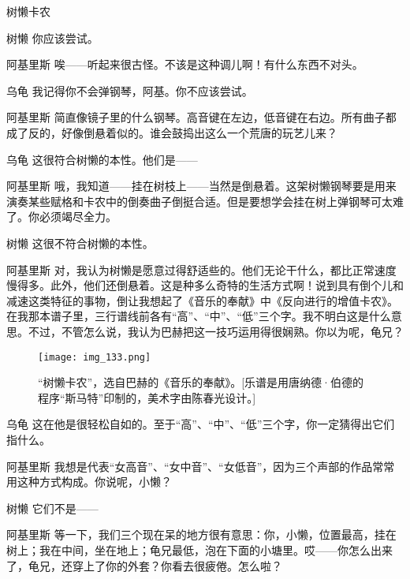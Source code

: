 \begin{dialog}{树懒卡农}
\begin{dialogue}
\item[树懒]你应该尝试。


\item[阿基里斯]唉——听起来很古怪。不该是这种调儿啊！有什么东西不对头。

\item[乌龟]我记得你不会弹钢琴，阿基。你不应该尝试。

\item[阿基里斯]简直像镜子里的什么钢琴。高音键在左边，低音键在右边。所有曲子都成了反的，好像倒悬着似的。谁会鼓捣出这么一个荒唐的玩艺儿来？

\item[乌龟]这很符合树懒的本性。他们是——

\item[阿基里斯]哦，我知道——挂在树枝上——当然是倒悬着。这架树懒钢琴要是用来演奏某些赋格和卡农中的倒奏曲子倒挺合适。但是要想学会挂在树上弹钢琴可太难了。你必须竭尽全力。

\item[树懒]这很不符合树懒的本性。

\item[阿基里斯]对，我认为树懒是愿意过得舒适些的。他们无论干什么，都比正常速度慢得多。此外，他们还倒悬着。这是种多么奇特的生活方式啊！说到具有倒个儿和减速这类特征的事物，倒让我想起了《音乐的奉献》中《反向进行的增值卡农》。在我那本谱子里，三行谱线前各有“高”、“中”、“低”三个字。我不明白这是什么意思。不过，不管怎么说，我认为巴赫把这一技巧运用得很娴熟。你以为呢，龟兄？

\begin{figure}
\texttt{[image: img\_133.png]}
\caption[《树懒卡农》，选自巴赫《音乐的奉献》。]
  {“树懒卡农”，选自巴赫的《音乐的奉献》。[乐谱是用唐纳德·伯德的程序“斯马特”印制的，美术字由陈春光设计。] }
\end{figure}

\item[乌龟]这在他是很轻松自如的。至于“高”、“中”、“低”三个字，你一定猜得出它们指什么。

\item[阿基里斯]我想是代表“女高音”、“女中音”、“女低音”，因为三个声部的作品常常用这种方式构成。你说呢，小懒？

\item[树懒]它们不是——

\item[阿基里斯]等一下，我们三个现在呆的地方很有意思：你，小懒，位置最高，挂在树上；我在中间，坐在地上；龟兄最低，泡在下面的小塘里。哎——你怎么出来了，龟兄，还穿上了你的外套？你看去很疲倦。怎么啦？


\end{dialogue}
\end{dialog}
